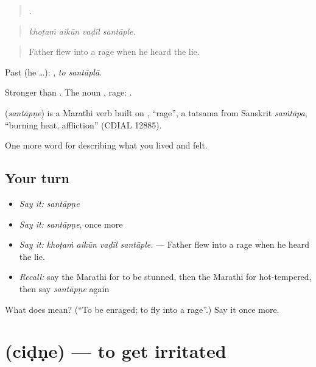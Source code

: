 \begin{quote}
   .
\end{quote}

\begin{quote}
\emph{khoṭaṁ aikūn vaḍīl santāple.}
\end{quote}

\begin{quote}
Father flew into a rage when he heard the lie.
\end{quote}

Past (he …):  , \emph{to santāplā}.

Stronger than . The noun , rage:   .

\begin{cousinweb}
\textbf{} (\emph{santāpṇe}) is a Marathi verb built on , \textquotedblleft{}rage\textquotedblright{}, a tatsama from Sanskrit \emph{saṁtāpa}, \textquotedblleft{}burning heat, affliction\textquotedblright{} (CDIAL 12885).
\end{cousinweb}

\begin{grammarlens}[title={What you've built}]
One more word for describing what you lived and felt.
\end{grammarlens}

\subsection*{Your turn}
\begin{itemize}
\raggedright
  \item \emph{Say it:} \emph{santāpṇe}
  \item \emph{Say it:} \emph{santāpṇe}, once more
  \item \emph{Say it:} \emph{khoṭaṁ aikūn vaḍīl santāple.} — Father flew into a rage when he heard the lie.
  \item \emph{Recall:} say the Marathi for to be stunned, then the Marathi for hot-tempered, then say \emph{santāpṇe} again
\end{itemize}

\begin{tcolorbox}[breakable,colback=teal!4,colframe=teal!35!black,title={Before you move on}]
What does  mean? (\textquotedblleft{}To be enraged; to fly into a rage\textquotedblright{}.) Say it once more.
\end{tcolorbox}
\section[\texorpdfstring{\mr{चिडणे} (ciḍṇe)}{चिडणे (ciḍṇe)}]{ (ciḍṇe) — to get irritated}

